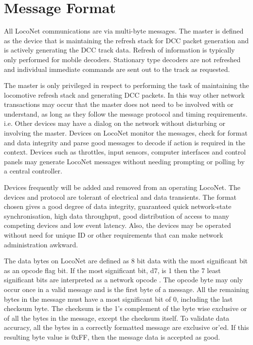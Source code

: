 \section{Message Format}

All LocoNet communications are via multi-byte messages. The master is defined as the device that is maintaining the refresh stack for DCC packet generation and is actively generating the DCC track data. Refresh of information is typically only performed for mobile decoders. Stationary type decoders are not refreshed and individual immediate commands are sent out to the track as requested.

The master is only privileged in respect to performing the task of maintaining the locomotive refresh stack and generating DCC packets. In this way other network transactions may occur that the master does not need to be involved with or understand, as long as they follow the message protocol and timing requirements. i.e. Other devices may have a dialog on the network without disturbing or involving the master. Devices on LocoNet monitor the messages, check for format and data integrity and parse good messages to decode if action is required in the context. Devices such as throttles, input sensors, computer interfaces and control panels may generate LocoNet messages without needing prompting or polling by a central controller.

Devices frequently will be added and removed from an operating LocoNet. The devices and protocol are tolerant of electrical and data transients. The format chosen gives a good degree of data integrity, guaranteed quick network-state synchronisation, high data throughput, good distribution of access to many competing devices and low event latency. Also, the devices may be operated without need for unique ID or other requirements that can make network administration awkward.

The data bytes on LocoNet are defined as 8 bit data with the most significant bit as an opcode flag bit. If the most significant bit, d7, is 1 then the 7 least significant bits are interpreted as a network opcode . The opcode byte may only occur once in a valid message and is the first byte of a message. All the remaining bytes in the message must have a most significant bit of 0, including the last checksum byte. The checksum is the 1's complement of the byte wise exclusive or of all the bytes in the message, except the checksum itself. To validate data accuracy, all the bytes in a correctly formatted message are exclusive or'ed. If this resulting byte value is 0xFF, then the message data is accepted as good.

